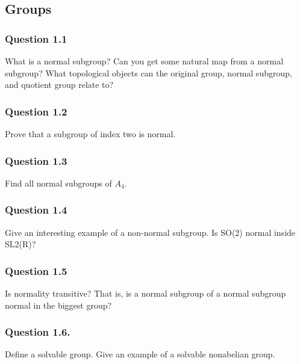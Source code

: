 \hypertarget{groups}{%
\subsection{Groups}\label{groups}}

\hypertarget{question-1.1}{%
\subsubsection{Question 1.1}\label{question-1.1}}

What is a normal subgroup? Can you get some natural map from a normal
subgroup? What topological objects can the original group, normal
subgroup, and quotient group relate to?

\hypertarget{question-1.2}{%
\subsubsection{Question 1.2}\label{question-1.2}}

Prove that a subgroup of index two is normal.

\hypertarget{question-1.3}{%
\subsubsection{Question 1.3}\label{question-1.3}}

Find all normal subgroups of \(A_4\).

\hypertarget{question-1.4}{%
\subsubsection{Question 1.4}\label{question-1.4}}

Give an interesting example of a non-normal subgroup. Is SO(2) normal
inside SL2(R)?

\hypertarget{question-1.5}{%
\subsubsection{Question 1.5}\label{question-1.5}}

Is normality transitive? That is, is a normal subgroup of a normal
subgroup normal in the biggest group?

\hypertarget{question-1.6.}{%
\subsubsection{Question 1.6.}\label{question-1.6.}}

Define a solvable group. Give an example of a solvable nonabelian group.

